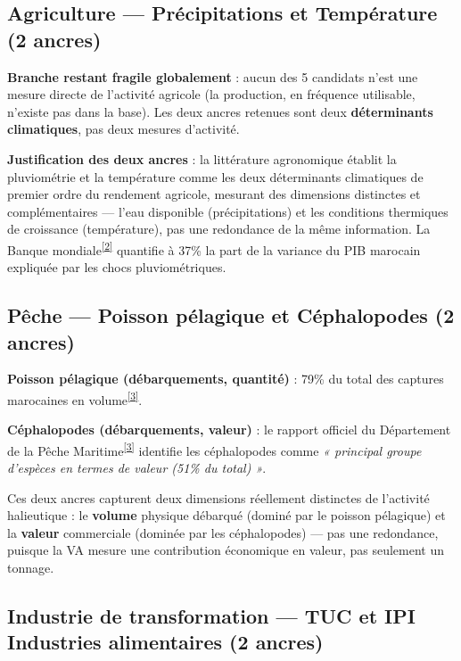 \documentclass[11pt,a4paper]{article}
\newcommand{\cit}[1]{\textsuperscript{\hyperlink{ref#1}{[#1]}}}
\begin{document}
\subsection{Agriculture --- Précipitations et Température (2 ancres)}

\begin{alertebox}
\textbf{Branche restant fragile globalement} : aucun des 5 candidats n'est une mesure directe de l'activité agricole (la production, en fréquence utilisable, n'existe pas dans la base). Les deux ancres retenues sont deux \textbf{déterminants climatiques}, pas deux mesures d'activité.
\end{alertebox}

\textbf{Justification des deux ancres} : la littérature agronomique établit la pluviométrie et la température comme les deux déterminants climatiques de premier ordre du rendement agricole, mesurant des dimensions distinctes et complémentaires --- l'eau disponible (précipitations) et les conditions thermiques de croissance (température), pas une redondance de la même information. La Banque mondiale\cit{2} quantifie à 37\% la part de la variance du PIB marocain expliquée par les chocs pluviométriques.

\subsection{Pêche --- Poisson pélagique et Céphalopodes (2 ancres)}

\textbf{Poisson pélagique (débarquements, quantité)} : 79\% du total des captures marocaines en volume\cit{3}.

\textbf{Céphalopodes (débarquements, valeur)} : le rapport officiel du Département de la Pêche Maritime\cit{3} identifie les céphalopodes comme \textit{« principal groupe d'espèces en termes de valeur (51\% du total) »}.

\begin{ancrebox}
Ces deux ancres capturent deux dimensions réellement distinctes de l'activité halieutique : le \textbf{volume} physique débarqué (dominé par le poisson pélagique) et la \textbf{valeur} commerciale (dominée par les céphalopodes) --- pas une redondance, puisque la VA mesure une contribution économique en valeur, pas seulement un tonnage.
\end{ancrebox}

\subsection{Industrie de transformation --- TUC et IPI Industries alimentaires (2 ancres)}
\end{document}
